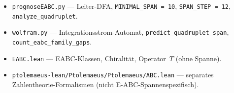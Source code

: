 \documentclass[11pt,a4paper]{article}
\begin{document}
\begin{itemize}
  \item \texttt{prognoseEABC.py} --- Leiter-DFA, \texttt{MINIMAL\_SPAN = 10},
        \texttt{SPAN\_STEP = 12}, \texttt{analyze\_quadruplet}.
  \item \texttt{wolfram.py} --- Integrationsstrom-Automat,
        \texttt{predict\_quadruplet\_span}, \texttt{count\_eabc\_family\_gaps}.
  \item \texttt{EABC.lean} --- EABC-Klassen, Chiralität, Operator~$T$ (ohne Spanne).
  \item \texttt{ptolemaeus-lean/Ptolemaeus/Ptolemaeus/ABC.lean} --- separates
        Zahlentheorie-Formalismen (nicht E-ABC-Spannenspezifisch).
\end{itemize}
\end{document}
